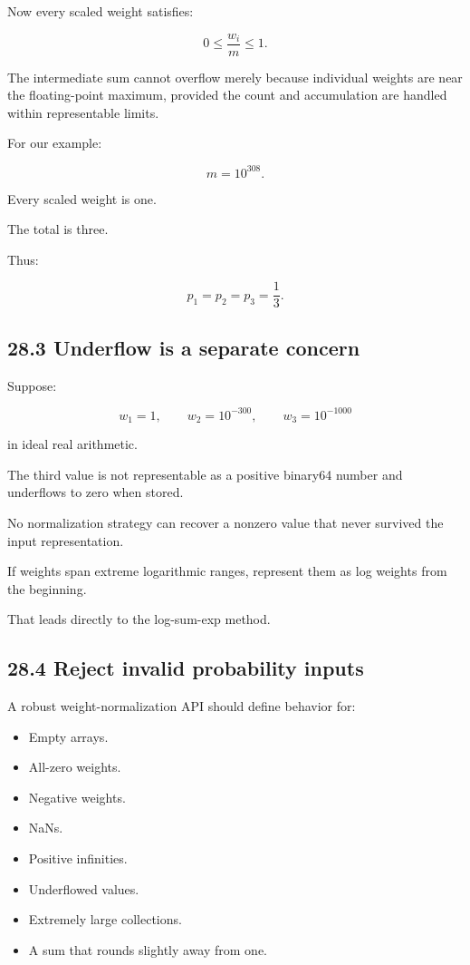 Now every scaled weight satisfies:

\[ 0\le\frac{w_i}{m}\le1. \]

The intermediate sum cannot overflow merely because individual weights are near the floating-point maximum, provided the count and accumulation are handled within representable limits.

For our example:

\[ m=10^{308}. \]

Every scaled weight is one.

The total is three.

Thus:

\[ \boxed{ p_1=p_2=p_3=\frac13 }. \]

\subsection{28.3 Underflow is a separate concern}\label{02-foundations-ii-ch031-underflow-is-a-separate-concern}

\hypertarget{02-foundations-ii-ch031-underflow-is-a-separate-concern}{}

Suppose:

\[ w_1=1, \qquad w_2=10^{-300}, \qquad w_3=10^{-1000} \]

in ideal real arithmetic.

The third value is not representable as a positive binary64 number and underflows to zero when stored.

No normalization strategy can recover a nonzero value that never survived the input representation.

If weights span extreme logarithmic ranges, represent them as log weights from the beginning.

That leads directly to the log-sum-exp method.

\subsection{28.4 Reject invalid probability inputs}\label{02-foundations-ii-ch031-reject-invalid-probability-inputs}

\hypertarget{02-foundations-ii-ch031-reject-invalid-probability-inputs}{}

A robust weight-normalization API should define behavior for:

\begin{itemize}
\tightlist
\item
  Empty arrays.
\item
  All-zero weights.
\item
  Negative weights.
\item
  NaNs.
\item
  Positive infinities.
\item
  Underflowed values.
\item
  Extremely large collections.
\item
  A sum that rounds slightly away from one.
\end{itemize}

